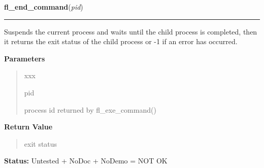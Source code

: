 \hspace{.8\funcindent}\begin{boxedminipage}{\funcwidth}

    \raggedright \textbf{fl\_end\_command}(\textit{pid})

    \vspace{-1.5ex}

    \rule{\textwidth}{0.5\fboxrule}
\setlength{\parskip}{2ex}
    Suspends the current process and waits until the child process is 
    completed, then it returns the exit status of the child process or -1 
    if an error has occurred.

\setlength{\parskip}{1ex}
      \textbf{Parameters}
      \vspace{-1ex}

      \begin{quote}
        \begin{Ventry}{xxx}

          \item[pid]

          process id returned by fl\_exe\_command()

        \end{Ventry}

      \end{quote}

      \textbf{Return Value}
    \vspace{-1ex}

      \begin{quote}
      exit status

      \end{quote}

\textbf{Status:} Untested + NoDoc + NoDemo = NOT OK



    \end{boxedminipage}

    \label{xformslib:library:fl_end_command}

    \vspace{0.5ex}

